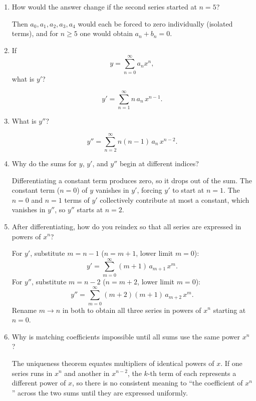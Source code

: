 \documentclass{essay}
\begin{document}
\begin{enumerate}[leftmargin=*, itemsep=8pt]
  \item How would the answer change if the second series started at \(n=5\)?
    \begin{answer}
      Then $a_0, a_1, a_2, a_3, a_4$ would each be forced to zero individually
      (isolated terms), and for $n \ge 5$ one would obtain $a_n + b_n = 0$.
    \end{answer}

  \item If \[ y=\sum_{n=0}^{\infty} a_n x^n, \] what is \(y'\)?
    \begin{answer}
      \[
        y' = \sum_{n=1}^{\infty} n\, a_n\, x^{n-1}.
      \]
    \end{answer}

  \item What is \(y''\)?
    \begin{answer}
      \[
        y'' = \sum_{n=2}^{\infty} n(n-1)\, a_n\, x^{n-2}.
      \]
    \end{answer}

  \item Why do the sums for \(y\), \(y'\), and \(y''\) begin at
    different indices?
    \begin{answer}
      Differentiating a constant term produces zero, so it drops out of the sum.
      The constant term ($n=0$) of $y$ vanishes in $y'$, forcing $y'$
      to start at
      $n=1$. The $n=0$ and $n=1$ terms of $y'$ collectively
      contribute at most a
      constant, which vanishes in $y''$, so $y''$ starts at $n=2$.
    \end{answer}

  \item After differentiating, how do you reindex so that all series
    are expressed in powers of \(x^n\)?
    \begin{answer}
      For $y'$, substitute $m = n-1$ ($n = m+1$, lower limit $m=0$):
      \[
        y' = \sum_{m=0}^{\infty} (m+1)\,a_{m+1}\,x^m.
      \]
      For $y''$, substitute $m = n-2$ ($n = m+2$, lower limit $m=0$):
      \[
        y'' = \sum_{m=0}^{\infty} (m+2)(m+1)\,a_{m+2}\,x^m.
      \]
      Rename $m \to n$ in both to obtain all three series in powers
      of $x^n$ starting
      at $n=0$.
    \end{answer}

  \item Why is matching coefficients impossible until all sums use
    the same power \(x^n\)?
    \begin{answer}
      The uniqueness theorem equates multipliers of identical powers
      of $x$. If one
      series runs in $x^n$ and another in $x^{n-2}$, the $k$-th term of each
      represents a different power of $x$, so there is no consistent meaning to
      ``the coefficient of $x^n$'' across the two sums until they are expressed
      uniformly.
    \end{answer}


\end{enumerate}
\end{document}
